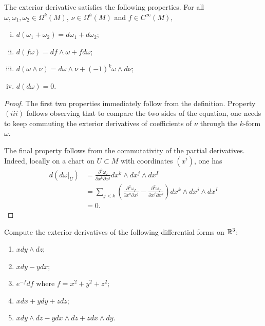 \begin{lemma}\label{lem:ext_deriv}
	The exterior derivative satisfies the following properties.
	For all $\omega,\omega_1,\omega_2\in\Omega^k(M)$, $\nu\in\Omega^h(M)$ and $f\in C^\infty(M)$,
	\begin{enumerate}[(i)]
		\item $d(\omega_1 + \omega_2) = d\omega_1 + d\omega_2$;
		\item $d(f\omega) = df\wedge \omega + f d\omega$;
		\item $d(\omega\wedge\nu) = d\omega\wedge \nu + (-1)^k \omega\wedge d\nu$;
		\item $d(d\omega) = 0$.
	\end{enumerate}
\end{lemma}
\begin{proof}
	The first two properties immediately follow from the definition.
	Property $(iii)$ follows observing that to compare the two sides of the equation, one needs to keep commuting the exterior derivatives of coefficients of $\nu$ through the $k$-form $\omega$.

	The final property follows from the commutativity of the partial derivatives. Indeed, locally on a chart on $U\subset M$ with coordinates $(x^i)$, one has
	\begin{align}
		d(d\omega|_U) & = \frac{\partial^2 \omega_I}{\partial x^k\partial x^j} dx^k\wedge dx^j \wedge dx^I                                                                                \\
		              & = \sum_{j<k} \left(\frac{\partial^2 \omega_I}{\partial x^k\partial x^j}  - \frac{\partial^2 \omega_I}{\partial x^j\partial x^k}\right)dx^k\wedge dx^j \wedge dx^I \\
		              & = 0.
	\end{align}
\end{proof}

\begin{exercise}
	Compute the exterior derivatives of the following differential forms on $\mathbb{R}^3$:
	\begin{enumerate}
		\item $x dy \wedge dz$;
		\item $x dy - y dx$;
		\item $e^{-f}df$ where $f = x^2 + y^2 + z^2$;
		\item $x dx + y dy + z dz$;
		\item $x dy\wedge dz - y dx\wedge dz + z dx\wedge dy$.
	\end{enumerate}
\end{exercise}

